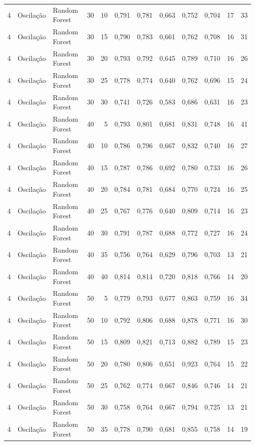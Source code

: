 \begin{longtable}{@{}rllrrrrrrrrr@{}}
4 & Oscilação & Random Forest & 30 & 10 & 0,791 & 0,781 & 0,663 & 0,752 & 0,704 & 17 & 33 \\
4 & Oscilação & Random Forest & 30 & 15 & 0,790 & 0,783 & 0,661 & 0,762 & 0,708 & 16 & 31 \\
4 & Oscilação & Random Forest & 30 & 20 & 0,793 & 0,792 & 0,645 & 0,789 & 0,710 & 16 & 26 \\
4 & Oscilação & Random Forest & 30 & 25 & 0,778 & 0,774 & 0,640 & 0,762 & 0,696 & 15 & 24 \\
4 & Oscilação & Random Forest & 30 & 30 & 0,741 & 0,726 & 0,583 & 0,686 & 0,631 & 16 & 23 \\
4 & Oscilação & Random Forest & 40 & 5 & 0,793 & 0,801 & 0,681 & 0,831 & 0,748 & 16 & 41 \\
4 & Oscilação & Random Forest & 40 & 10 & 0,786 & 0,796 & 0,667 & 0,832 & 0,740 & 16 & 27 \\
4 & Oscilação & Random Forest & 40 & 15 & 0,787 & 0,786 & 0,692 & 0,780 & 0,733 & 16 & 26 \\
4 & Oscilação & Random Forest & 40 & 20 & 0,784 & 0,781 & 0,684 & 0,770 & 0,724 & 16 & 25 \\
4 & Oscilação & Random Forest & 40 & 25 & 0,767 & 0,776 & 0,640 & 0,809 & 0,714 & 16 & 23 \\
4 & Oscilação & Random Forest & 40 & 30 & 0,791 & 0,787 & 0,688 & 0,772 & 0,727 & 16 & 24 \\
4 & Oscilação & Random Forest & 40 & 35 & 0,756 & 0,764 & 0,629 & 0,796 & 0,703 & 13 & 21 \\
4 & Oscilação & Random Forest & 40 & 40 & 0,814 & 0,814 & 0,720 & 0,818 & 0,766 & 14 & 20 \\
4 & Oscilação & Random Forest & 50 & 5 & 0,779 & 0,793 & 0,677 & 0,863 & 0,759 & 16 & 34 \\
4 & Oscilação & Random Forest & 50 & 10 & 0,792 & 0,806 & 0,688 & 0,878 & 0,771 & 16 & 30 \\
4 & Oscilação & Random Forest & 50 & 15 & 0,809 & 0,821 & 0,713 & 0,882 & 0,789 & 15 & 23 \\
4 & Oscilação & Random Forest & 50 & 20 & 0,780 & 0,806 & 0,651 & 0,923 & 0,764 & 15 & 22 \\
4 & Oscilação & Random Forest & 50 & 25 & 0,762 & 0,774 & 0,667 & 0,846 & 0,746 & 14 & 21 \\
4 & Oscilação & Random Forest & 50 & 30 & 0,758 & 0,764 & 0,667 & 0,794 & 0,725 & 13 & 21 \\
4 & Oscilação & Random Forest & 50 & 35 & 0,778 & 0,790 & 0,681 & 0,855 & 0,758 & 14 & 19 \\

\end{longtable}
